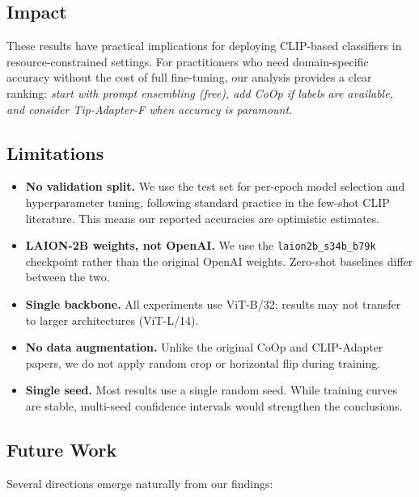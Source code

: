 \documentclass[10pt,twocolumn,letterpaper]{article}
\begin{document}
\subsection{Impact}

These results have practical implications for deploying CLIP-based
classifiers in resource-constrained settings.  For practitioners who need
domain-specific accuracy without the cost of full fine-tuning, our
analysis provides a clear ranking: \emph{start with prompt ensembling
(free), add CoOp if labels are available, and consider Tip-Adapter-F
when accuracy is paramount.}

\subsection{Limitations}

\begin{itemize}
  \item \textbf{No validation split.}  We use the test set for
    per-epoch model selection and hyperparameter tuning, following
    standard practice in the few-shot CLIP literature.  This means our
    reported accuracies are optimistic estimates.
  \item \textbf{LAION-2B weights, not OpenAI.}  We use the
    \texttt{laion2b\_s34b\_b79k} checkpoint rather than the original
    OpenAI weights.  Zero-shot baselines differ between the two.
  \item \textbf{Single backbone.}  All experiments use ViT-B/32;
    results may not transfer to larger architectures (ViT-L/14).
  \item \textbf{No data augmentation.}  Unlike the original CoOp and
    CLIP-Adapter papers, we do not apply random crop or horizontal flip
    during training.
  \item \textbf{Single seed.}  Most results use a single random seed.
    While training curves are stable, multi-seed confidence intervals
    would strengthen the conclusions.
\end{itemize}

\subsection{Future Work}

Several directions emerge naturally from our findings:
\end{document}
